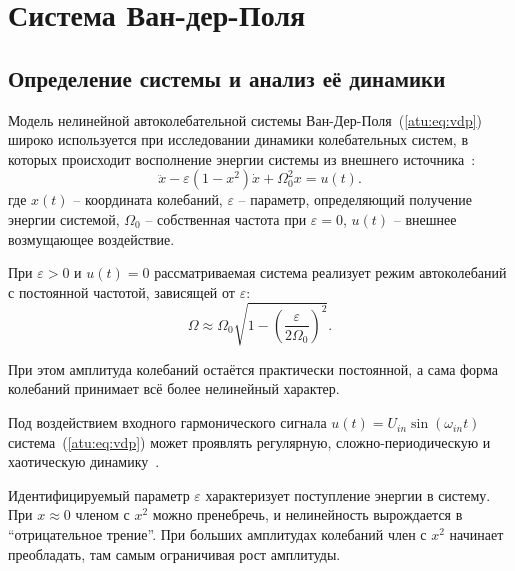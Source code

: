 
\FloatBarrier

\section{Система Ван-дер-Поля} %
\label{atu:sect:vdp}


\subsection{Определение системы и анализ её динамики} %


Модель нелинейной автоколебательной системы Ван-Дер-Поля~(\ref{atu:eq:vdp})
широко используется при исследовании динамики
колебательных систем, в которых происходит восполнение
энергии системы из внешнего источника~\cite{anisch_nonlin_eff,magni_theory_dyn_chaos,atu_asau16,atu_st75,chulichkcov_mm_ml_dyn}:
%
\begin{equation}
 \ddot{x} - \varepsilon (1-x^2)  \dot{x} + \Omega_0^2 x  = u(t) .
\label{atu:eq:vdp}
\end{equation}
\noindent
где
\(x(t)\) -- координата колебаний,
\( \varepsilon \) -- параметр, определяющий получение
  энергии системой,
\( \Omega_0 \) -- собственная частота при \( \varepsilon = 0 \),
\(u(t)\) -- внешнее возмущающее воздействие.

При \( \varepsilon > 0 \) и \( u(t) = 0 \)
рассматриваемая система реализует режим автоколебаний
с постоянной частотой, зависящей от \( \varepsilon \):
%
\begin{equation}
\Omega \approx \Omega_0 \sqrt{ 1 - \left( \frac{\varepsilon}{2 \Omega_0} \right)^2 }.
\label{atu:eq:vdp_Omega}
\end{equation}

При этом амплитуда колебаний остаётся практически постоянной,
а сама форма колебаний принимает всё более нелинейный характер.

Под воздействием входного гармонического сигнала
\( u(t) = U_{in} \sin ( \omega_{in} t ) \)
система~(\ref{atu:eq:vdp}) может проявлять регулярную, сложно-периодическую
и хаотическую динамику~\cite{atu_itcs2011,atu_ISDMCI2011}.

Идентифицируемый параметр \( \varepsilon \)
характеризует поступление энергии в систему.
При $x \approx 0$ членом с $x^2$ можно пренебречь,
и нелинейность вырождается в ``отрицательное трение''.
При больших амплитудах колебаний член с $x^2$
начинает преобладать, там самым ограничивая рост амплитуды.


